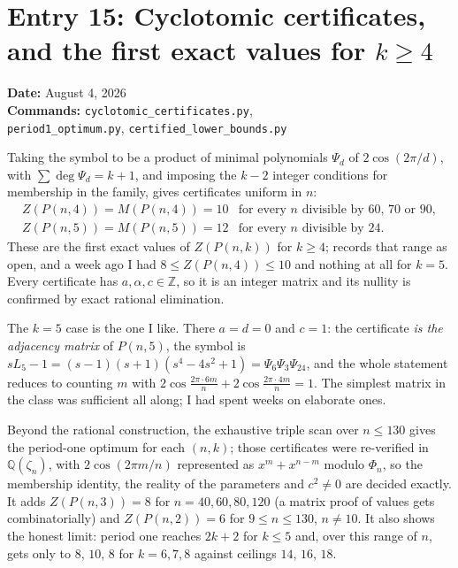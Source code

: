 \documentclass[12pt]{article}
\begin{document}
\clearpage
\section*{Entry 15: Cyclotomic certificates, and the first exact values for $k\ge4$}
\textbf{Date:} August 4, 2026\\
\textbf{Commands:} {\small\texttt{cyclotomic\_certificates.py},}\\
{\small\texttt{period1\_optimum.py}, \texttt{certified\_lower\_bounds.py}}

Taking the symbol to be a product of minimal polynomials
$\Psi_d$ of $2\cos(2\pi/d)$, with $\sum\deg\Psi_d=k+1$, and imposing the $k-2$
integer conditions for membership in the family, gives certificates uniform in
$n$:
\[
\begin{array}{ll}
 Z(P(n,4))=M(P(n,4))=10 & \text{for every } n \text{ divisible by } 60,\,70
   \text{ or } 90,\\
 Z(P(n,5))=M(P(n,5))=12 & \text{for every } n \text{ divisible by } 24 .
\end{array}
\]
These are the first exact values of $Z(P(n,k))$ for $k\ge4$; \cite{K} records
that range as open, and a week ago I had $8\le Z(P(n,4))\le10$ and nothing at
all for $k=5$. Every certificate has $a,\alpha,c\in\mathbb Z$, so it is an
integer matrix and its nullity is confirmed by exact rational elimination.

The $k=5$ case is the one I like. There $a=d=0$ and $c=1$: the certificate
\emph{is the adjacency matrix} of $P(n,5)$, the symbol is
$sL_5-1=(s-1)(s+1)(s^4-4s^2+1)=\Psi_6\Psi_3\Psi_{24}$, and the whole statement
reduces to counting $m$ with
$2\cos\frac{2\pi\cdot6m}{n}+2\cos\frac{2\pi\cdot4m}{n}=1$. The simplest matrix
in the class was sufficient all along; I had spent weeks on elaborate ones.

Beyond the rational construction, the exhaustive triple scan over $n\le130$
gives the period-one optimum for each $(n,k)$; those certificates were
re-verified in $\mathbb Q(\zeta_n)$, with $2\cos(2\pi m/n)$ represented as
$x^m+x^{n-m}$ modulo $\Phi_n$, so the membership identity, the reality of the
parameters and $c^2\ne0$ are decided exactly. It adds $Z(P(n,3))=8$ for
$n=40,60,80,120$ (a matrix proof of values \cite{K} gets combinatorially) and
$Z(P(n,2))=6$ for $9\le n\le130$, $n\ne10$. It also shows the honest limit:
period one reaches $2k+2$ for $k\le5$ and, over this range of $n$, gets only to
$8$, $10$, $8$ for $k=6,7,8$ against ceilings $14$, $16$, $18$.
\end{document}
